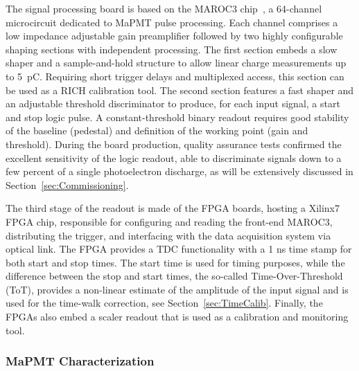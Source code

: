 \documentclass[5p,times,twocolumn]{elsarticle}
\begin{document}
The signal processing board is based on the MAROC3 chip~\cite{MAROC3:chip}, a 64-channel microcircuit
dedicated to MaPMT pulse processing. Each channel comprises a low impedance adjustable gain preamplifier followed
by two highly configurable shaping sections with independent processing. The first section embeds a slow shaper and
a sample-and-hold structure to allow linear charge measurements up to 5~pC. Requiring short trigger delays and
multiplexed access, this section can be used as a RICH calibration tool. The second section features a fast shaper and
an adjustable threshold discriminator to produce, for each input signal, a start and stop logic pulse. A constant-threshold
binary readout requires good stability of the baseline (pedestal) and definition of the working point (gain and
threshold). During the board production, quality assurance tests confirmed the excellent sensitivity of the logic
readout, able to discriminate signals down to a few percent of a single photoelectron discharge, as will be extensively
discussed in Section~\ref{sec:Commissioning}.

The third stage of the readout is made of the FPGA boards, hosting a Xilinx7 FPGA chip, responsible for configuring and reading the front-end MAROC3, distributing the trigger, and interfacing with the data acquisition system \cite{daq-nim} via optical link. The FPGA provides a TDC functionality with a 1 ns time stamp for both start and stop times. The start time is used for timing purposes, while the difference between the stop and start times, the so-called Time-Over-Threshold (ToT), provides a non-linear estimate of the amplitude of the input signal and is used for the time-walk correction, see Section~\ref{sec:TimeCalib}. Finally, the FPGAs also embed a scaler readout that is used as a calibration and monitoring tool.

\subsubsection{MaPMT Characterization}
\label{sec:FEtests}
\end{document}
